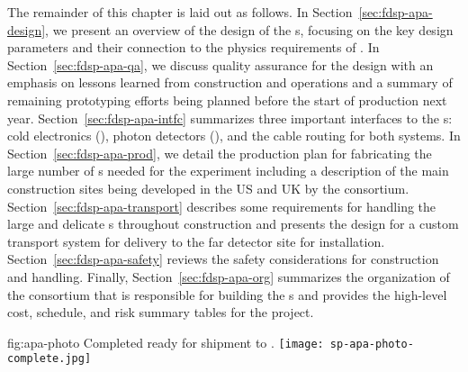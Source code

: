 The remainder of this chapter is laid out as follows.  In Section~\ref{sec:fdsp-apa-design}, we present an overview of the design of the s, focusing on the key design parameters and their connection to the physics requirements of .  In Section~\ref{sec:fdsp-apa-qa}, we discuss quality assurance for the design with an emphasis on lessons learned from  construction and operations and a summary of remaining prototyping efforts being planned before the start of production next year. Section~\ref{sec:fdsp-apa-intfc} summarizes three important interfaces to the s:  cold electronics (), photon detectors (), and the cable routing for both systems.  In Section~\ref{sec:fdsp-apa-prod}, we detail the production plan for fabricating the large number of s needed for the experiment including a description of the main construction sites being developed in the US and UK by the  consortium.  Section~\ref{sec:fdsp-apa-transport} describes some requirements for handling the large and delicate s throughout construction and presents the design for a custom transport system for delivery to the far detector site for installation. Section~\ref{sec:fdsp-apa-safety} reviews the safety considerations for  construction and handling. Finally,  Section~\ref{sec:fdsp-apa-org} summarizes the organization of the  consortium that is responsible for building the s and provides the high-level cost, schedule, and risk summary tables for the project. 

\begin{dunefigure}{fig:apa-photo}
{Completed   ready for shipment to .}
\texttt{[image: sp-apa-photo-complete.jpg]}
\end{dunefigure}
